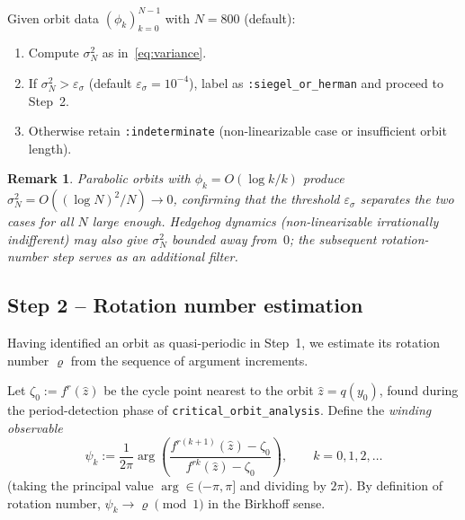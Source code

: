 \documentclass[12pt,a4paper]{article}
\newtheorem{remark}[theorem]{Remark}
\newcommand{\rot}{\varrho}    %
\newcommand{\qmap}{q}         %
\begin{document}
\begin{algorithm}
  \caption{Variance test}
  \label{alg:variance}
  Given orbit data $(\phi_k)_{k=0}^{N-1}$ with $N = 800$ (default):
  \begin{enumerate}
    \item Compute $\sigma^2_N$ as in~\eqref{eq:variance}.
    \item If $\sigma^2_N > \varepsilon_\sigma$ (default $\varepsilon_\sigma = 10^{-4}$),
          label as \texttt{:siegel\_or\_herman} and proceed to Step~2.
    \item Otherwise retain \texttt{:indeterminate} (non-linearizable case
          or insufficient orbit length).
  \end{enumerate}
\end{algorithm}

\begin{remark}
  Parabolic orbits with $\phi_k = O(\log k / k)$ produce
  $\sigma^2_N = O((\log N)^2/N) \to 0$, confirming that the threshold
  $\varepsilon_\sigma$ separates the two cases for all $N$ large enough.
  Hedgehog dynamics (non-linearizable irrationally indifferent) may also
  give $\sigma^2_N$ bounded away from~$0$; the subsequent rotation-number
  step serves as an additional filter.
\end{remark}

\subsection{Step 2 -- Rotation number estimation}
\label{ssec:rot_estimate}

Having identified an orbit as quasi-periodic in Step~1, we estimate its
rotation number $\rot$ from the sequence of argument increments.

Let $\zeta_0 := f^r(\hat{z})$ be the cycle point nearest to the orbit
$\hat{z} = \qmap(y_0)$, found during the period-detection phase of
\texttt{critical\_orbit\_analysis}.
Define the \emph{winding observable}
\begin{equation}\label{eq:wind_obs}
  \psi_k := \frac{1}{2\pi}\arg\!\left(\frac{f^{r(k+1)}(\hat{z}) - \zeta_0}%
                                        {f^{rk}(\hat{z}) - \zeta_0}\right),
  \qquad k = 0, 1, 2,\ldots
\end{equation}
(taking the principal value $\arg\in(-\pi,\pi]$ and dividing by $2\pi$).
By definition of rotation number,
$\psi_k\to\rot \pmod{1}$ in the Birkhoff sense.
\end{document}

